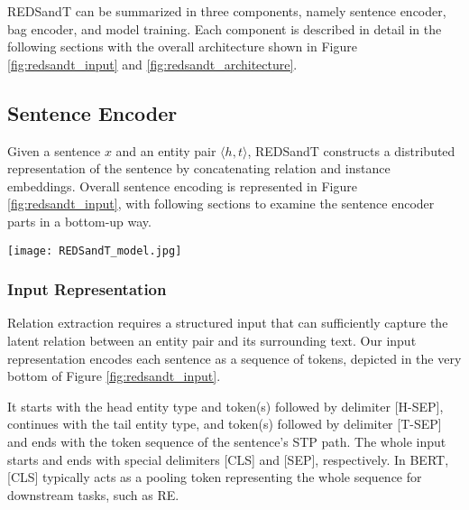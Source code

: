\documentclass[11pt,a4paper]{article}
\begin{document}
REDSandT can be summarized in three components, namely sentence encoder, bag encoder, and model training. Each component is described in detail in the following sections with the overall architecture shown in Figure \ref{fig:redsandt_input} and \ref{fig:redsandt_architecture}.


\subsection{Sentence Encoder}
Given a sentence $x$ and an entity pair $\langle h, t \rangle$, REDSandT constructs a distributed representation of the sentence by concatenating relation and instance embeddings. Overall sentence encoding is represented in Figure \ref{fig:redsandt_input}, with following sections to examine the sentence encoder parts in a bottom-up way.

\begin{figure*}
    \centering
    \texttt{[image: REDSandT\_model.jpg]}
    \caption{Sentence Representation in REDSandT. The input embedding $h_0$ to BERT is created by summing over the positional and byte pair embeddings for each token in the structured input. States $h_t$ are obtained by self-attending over the states of the previous layer $h_{t-1}$. Final sentence representation is obtained by concatenating the relation embedding $r_{ht}$, and the final fine-tuned BERT layer $h_L$ weighted with relation attention $\alpha_r$. Head and tail tokens participating in the relation embedding formation are marked with bold and dashed lines respectively.}
    \label{fig:redsandt_input}
    \vspace{-4mm}
\end{figure*}


\subsubsection{Input Representation}
\label{subsec:inputRepresentation}
Relation extraction requires a structured input that can sufficiently capture the latent relation between an entity pair and its surrounding text. Our input representation encodes each sentence as a sequence of tokens, depicted in the very bottom of Figure \ref{fig:redsandt_input}. 

It starts with the head entity type and token(s) followed by delimiter [H-SEP], continues with the tail entity type, and token(s) followed by delimiter [T-SEP] and ends with the token sequence of the sentence's STP path. The whole input starts and ends with special delimiters [CLS] and [SEP], respectively. In BERT, [CLS] typically acts as a pooling token representing the whole sequence for downstream tasks, such as RE. 
\end{document}
